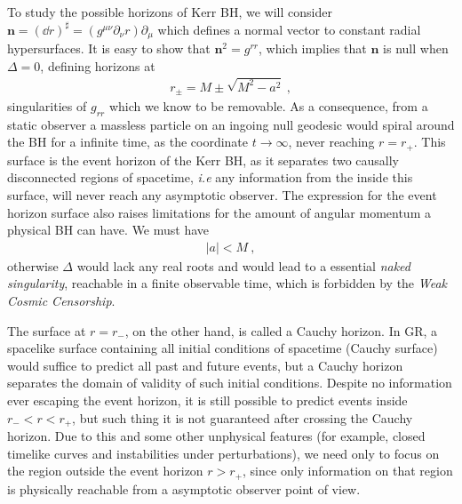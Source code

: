 To study the possible horizons of Kerr BH, we will consider $\bm{n} = (\dd r)^\sharp = (g^{\mu\nu} \partial_\nu r) \partial_\mu$ which defines a normal vector to constant radial hypersurfaces.
It is easy to show that $\bm{n}^2 = g^{rr}$, which implies that $\bm{n}$ is null when $\Delta=0$, defining horizons at 
\begin{align}
    r_\pm = M \pm \sqrt{M^2 - a^2} ~,
    \label{eq2:KerrRadius}
\end{align}
singularities of $g_{rr}$ which we know to be removable.
As a consequence, from a static observer a massless particle on an ingoing null geodesic would spiral around the BH for a infinite time, as the coordinate $t\to\infty$, never reaching $r=r_{+}$.
This surface is the event horizon of the Kerr BH, as it separates two causally disconnected regions of spacetime, \emph{i.e} any information from the inside this surface, will never reach any asymptotic observer. 
The expression for the event horizon surface also raises limitations for the amount of angular momentum a physical BH can have.
We must have 
\begin{align}
    |a| < M ~,
    \label{eq2:spinLimit}
\end{align}
otherwise $\Delta$ would lack any real roots and would lead to a essential \emph{naked singularity}, reachable in a finite observable time, which is forbidden by the \emph{Weak Cosmic Censorship}.  

The surface at $r=r_{-}$, on the other hand, is called a Cauchy horizon.
In GR, a spacelike surface containing all initial conditions of spacetime (Cauchy surface) would suffice to predict all past and future events, but a Cauchy horizon separates the domain of validity of such initial conditions.
Despite no information ever escaping the event horizon, it is still possible to predict events inside $r_{-} < r < r_{+}$, but such thing it is not guaranteed after crossing the Cauchy horizon.
Due to this and some other unphysical features (for example, closed timelike curves and instabilities under perturbations), we need only to focus on the region outside the event horizon $r>r_{+}$, since only information on that region is physically reachable from a asymptotic observer point of view.

